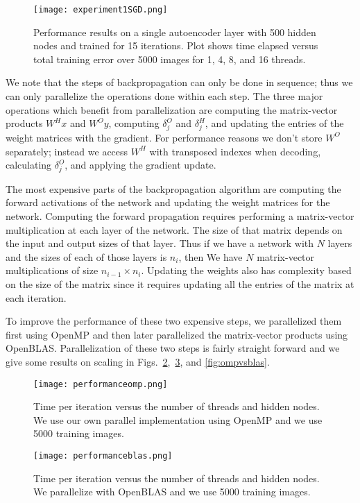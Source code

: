 \begin{figure}[h]
\centering
\texttt{[image: experiment1SGD.png]}
\caption{Performance results on a single autoencoder layer with 500 hidden nodes and trained for 15 iterations. Plot shows time elapsed versus total training error over 5000 images for 1, 4, 8, and 16 threads.}
\label{fig:experiment1}
\end{figure}


We note that the steps of backpropagation can only be done in sequence; thus we can only parallelize the operations done within each step. The three major operations which benefit from parallelization are computing the matrix-vector products $W^{H}x$ and $W^{O}y$, computing $\delta^O_j$ and $\delta^H_j$, and updating the entries of the weight matrices with the gradient. For performance reasons we don't store $W^O$ separately; instead we access $W^H$ with transposed indexes when decoding, calculating $\delta^O_j$, and applying the gradient update.

The most expensive parts of the backpropagation algorithm are computing the forward activations of the network and updating the weight matrices for the network. Computing the forward propagation requires performing a matrix-vector multiplication at each layer of the network. The size of that matrix depends on the input and output sizes of that layer. Thus if we have a network with $N$ layers and the sizes of each of those layers is $n_i$, then We have $N$ matrix-vector multiplications of size $n_{i-1} \times n_i$. Updating the weights also has complexity based on the size of the matrix since it requires updating all the entries of the matrix at each iteration.

To improve the performance of these two expensive steps, we parallelized them first using OpenMP and then later parallelized the matrix-vector products using OpenBLAS. Parallelization of these two steps is fairly straight forward and we give some results on scaling in Figs.~\ref{fig:performanceomp},~\ref{fig:performanceblas}, and \ref{fig:ompvsblas}.


\begin{figure}[h]
\centering
\texttt{[image: performanceomp.png]}
\caption{Time per iteration versus the number of threads and hidden nodes. We use our own parallel implementation using OpenMP and we use 5000 training images.}
\label{fig:performanceomp}
\end{figure}


\begin{figure}[h]
\centering
\texttt{[image: performanceblas.png]}
\caption{Time per iteration versus the number of threads and hidden nodes. We parallelize with OpenBLAS and we use 5000 training images.}
\label{fig:performanceblas}
\end{figure}

